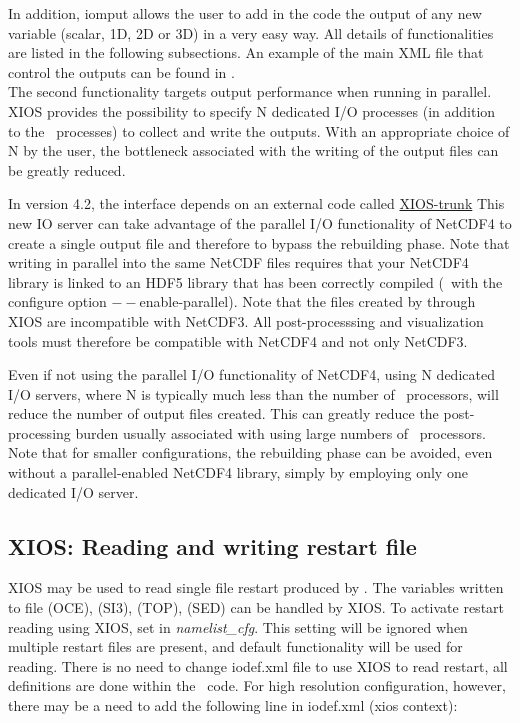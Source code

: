 \documentclass[../main/NEMO_manual]{subfiles}
\begin{document}
In addition, iomput allows the user to add in the code the output of any new variable (scalar, 1D, 2D or 3D)
in a very easy way.
All details of  functionalities are listed in the following subsections.
An example of the main XML file that control the outputs can be found in .\\

The second functionality targets output performance when running in parallel.
XIOS provides the possibility to specify N dedicated I/O processes (in addition to the \NEMO\ processes)
to collect and write the outputs.
With an appropriate choice of N by the user, the bottleneck associated with the writing of
the output files can be greatly reduced.

In version 4.2, the  interface depends on
an external code called \href{https://forge.ipsl.jussieu.fr/ioserver/browser/XIOS/trunk}{XIOS-trunk}
This new IO server can take advantage of the parallel I/O functionality of NetCDF4 to
create a single output file and therefore to bypass the rebuilding phase.
Note that writing in parallel into the same NetCDF files requires that your NetCDF4 library is linked to
an HDF5 library that has been correctly compiled (\ie\ with the configure option $--$enable-parallel).
Note that the files created by  through XIOS are incompatible with NetCDF3.
All post-processsing and visualization tools must therefore be compatible with NetCDF4 and not only NetCDF3.

Even if not using the parallel I/O functionality of NetCDF4, using N dedicated I/O servers,
where N is typically much less than the number of \NEMO\ processors, will reduce the number of output files created.
This can greatly reduce the post-processing burden usually associated with using large numbers of \NEMO\ processors.
Note that for smaller configurations, the rebuilding phase can be avoided,
even without a parallel-enabled NetCDF4 library, simply by employing only one dedicated I/O server.

\subsection{XIOS: Reading and writing restart file}

XIOS may be used to read single file restart produced by \NEMO. The variables written to
file  (OCE),  (SI3),  (TOP),  (SED) can be handled by XIOS. 
To activate restart reading using XIOS, set 
in \textit{namelist\_cfg}. This setting will be ignored when multiple restart files are present, and default \NEMO
functionality will be used for reading. There is no need to change iodef.xml file to use XIOS to read
restart, all definitions are done within the \NEMO\ code. For high resolution configuration, however,
there may be a need to add the following line in iodef.xml (xios context):
\end{document}
